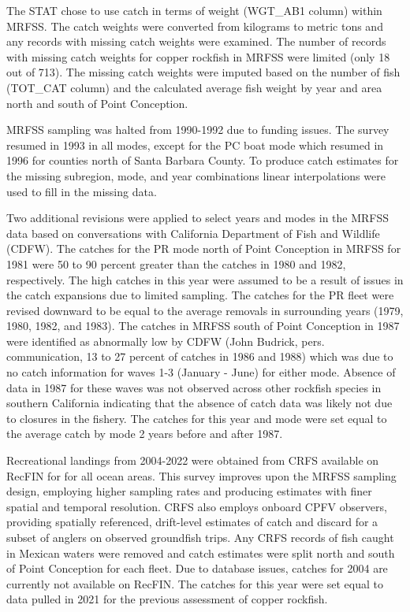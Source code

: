 \documentclass[11pt,
  letterpaper,
]{article}
\begin{document}
The STAT chose to use catch in terms of weight (WGT\_AB1 column) within MRFSS. The catch weights were converted from kilograms to metric tons and any records with missing catch weights were examined. The number of records with missing catch weights for copper rockfish in MRFSS were limited (only 18 out of 713). The missing catch weights were imputed based on the number of fish (TOT\_CAT column) and the calculated average fish weight by year and area north and south of Point Conception.

MRFSS sampling was halted from 1990-1992 due to funding issues. The survey resumed in 1993 in all modes, except for the PC boat mode which resumed in 1996 for counties north of Santa Barbara County. To produce catch estimates for the missing subregion, mode, and year combinations linear interpolations were used to fill in the missing data.

Two additional revisions were applied to select years and modes in the MRFSS data based on conversations with California Department of Fish and Wildlife (CDFW). The catches for the PR mode north of Point Conception in MRFSS for 1981 were 50 to 90 percent greater than the catches in 1980 and 1982, respectively. The high catches in this year were assumed to be a result of issues in the catch expansions due to limited sampling. The catches for the PR fleet were revised downward to be equal to the average removals in surrounding years (1979, 1980, 1982, and 1983). The catches in MRFSS south of Point Conception in 1987 were identified as abnormally low by CDFW (John Budrick, pers. communication, 13 to 27 percent of catches in 1986 and 1988) which was due to no catch information for waves 1-3 (January - June) for either mode. Absence of data in 1987 for these waves was not observed across other rockfish species in southern California indicating that the absence of catch data was likely not due to closures in the fishery. The catches for this year and mode were set equal to the average catch by mode 2 years before and after 1987.

Recreational landings from 2004-2022 were obtained from CRFS available on RecFIN for for all ocean areas. This survey improves upon the MRFSS sampling design, employing higher sampling rates and producing estimates with finer spatial and temporal resolution. CRFS also employs onboard CPFV observers, providing spatially referenced, drift-level estimates of catch and discard for a subset of anglers on observed groundfish trips. Any CRFS records of fish caught in Mexican waters were removed and catch estimates were split north and south of Point Conception for each fleet. Due to database issues, catches for 2004 are currently not available on RecFIN. The catches for this year were set equal to data pulled in 2021 for the previous assessment of copper rockfish.
\end{document}
